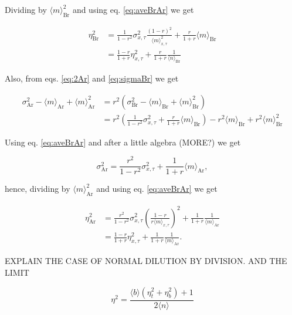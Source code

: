 Dividing by $\langle m\rangle_\text{Br}^2$ and using eq. \ref{eq:aveBrAr} we get

\begin{equation}
  \begin{split}
    \eta_\text{Br}^2 &= \frac{1}{1-r^2}\sigma_{x,\tau}^2\frac{(1-r)^2}{\langle m\rangle_{x,\tau}^2} + \frac{r}{1+r}\langle m\rangle_\text{Br}\\
    & = \frac{1-r}{1+r}\eta_{x,\tau}^2+\frac{r}{1+r}\frac{1}{\langle n\rangle_\text{Br}}
  \end{split}
\end{equation}

Also, from eqs. \ref{eq:2Ar} and \ref{eq:sigmaBr} we get

\begin{equation}
  \begin{split}
    \sigma^2_\text{Ar} - \langle m\rangle_\text{Ar} + \langle m\rangle_\text{Ar}^2 &= r^2\left(\sigma^2_\text{Br}- \langle m\rangle_\text{Br} + \langle m\rangle^2_\text{Br}\right)\\
  &=r^2\left(\frac{1}{1-r^2}\sigma^2_{x,\tau}+\frac{r}{1+r}\langle m\rangle_\text{Br}\right)-r^2\langle m\rangle_\text{Br} + r^2\langle m\rangle^2_\text{Br}
  \end{split}
\end{equation}

Using eq. \ref{eq:aveBrAr} and after a little algebra (MORE?) we get

\begin{equation}
  \sigma^2_\text{Ar} = \frac{r^2}{1-r^2}\sigma^2_{x,\tau}+\frac{1}{1+r}\langle m\rangle_\text{Ar},
\end{equation}

hence, dividing by $\langle m\rangle_\text{Ar}^2$ and using eq. \ref{eq:aveBrAr} we get

\begin{equation}
  \begin{split}
    \eta^2_\text{Ar} &= \frac{r^2}{1-r^2}\sigma^2_{x,\tau}\left(\frac{1-r}{r\langle m\rangle_{x,\tau}}\right)^2+\frac{1}{1+r}\frac{1}{\langle m\rangle_\text{Ar}}\\
    &=\frac{1-r}{1+r}\eta^2_{x,\tau}+\frac{1}{1+r}\frac{1}{\langle m\rangle_\text{Ar}}.
  \end{split}
\end{equation}

EXPLAIN THE CASE OF NORMAL DILUTION BY DIVISION. AND THE LIMIT

\begin{equation}
  \boxed{\eta^2 = \frac{\langle b\rangle\left(\eta^2_t + \eta^2_b\right)+1}{2\langle n\rangle}}
\end{equation}

